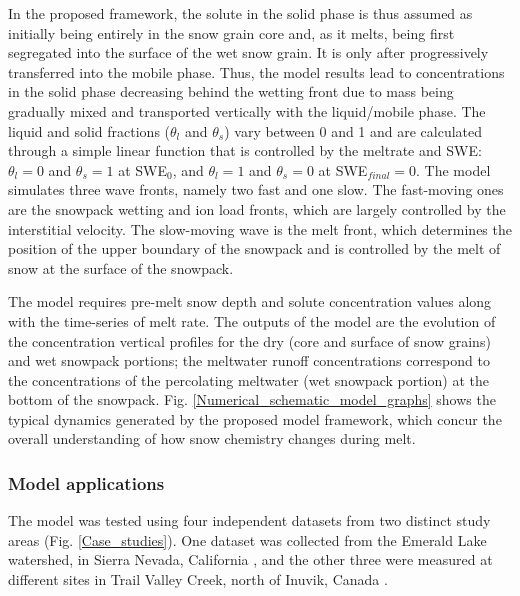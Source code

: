 \documentclass[authoryear,preprint,review,12pt]{elsarticle}
\begin{document}
In the proposed framework, the solute in the solid phase is thus assumed as initially being entirely in the snow grain core and, as it melts, being first segregated into the surface of the wet snow grain. It is only after progressively transferred into the mobile phase. Thus, the model results lead to concentrations in the solid phase decreasing behind the wetting front due to mass being gradually mixed and transported vertically with the liquid/mobile phase. The liquid and solid fractions ($\theta_l$ and $\theta_s$) vary between 0 and 1 and are calculated through a simple linear function that is controlled by the meltrate and SWE: $\theta_l = 0$ and $\theta_s = 1$ at SWE$_0$, and $\theta_l = 1$ and $\theta_s = 0$ at SWE$_{final} = 0$. The model simulates three wave fronts, namely two fast and one slow. The fast-moving ones are the snowpack wetting and ion load fronts, which are largely controlled by the interstitial velocity. The slow-moving wave is the melt front, which determines the position of the upper boundary of the snowpack and is controlled by the melt of snow at the surface of the snowpack. \par

The model requires pre-melt snow depth and solute concentration values along with the time-series of melt rate. The outputs of the model are the evolution of the concentration vertical profiles for the dry (core and surface of snow grains) and wet snowpack portions; the meltwater runoff concentrations correspond to the concentrations of the percolating meltwater (wet snowpack portion) at the bottom of the snowpack. Fig. \ref{Numerical_schematic_model_graphs} shows the typical dynamics generated by the proposed model framework, which concur the overall understanding of how snow chemistry changes during melt.

\subsubsection{Model applications}
\label{subsubsection:Model_application}

The model was tested using four independent datasets from two distinct study areas (Fig. \ref{Case_studies}). One dataset was collected from the Emerald Lake watershed, in Sierra Nevada, California \citep{Tonnessen1991,Harrington1998}, and the other three were measured at different sites in Trail Valley Creek, north of Inuvik, Canada \citep{Pomeroy1993,MARSH1996,Marsh1999}. 
\end{document}
